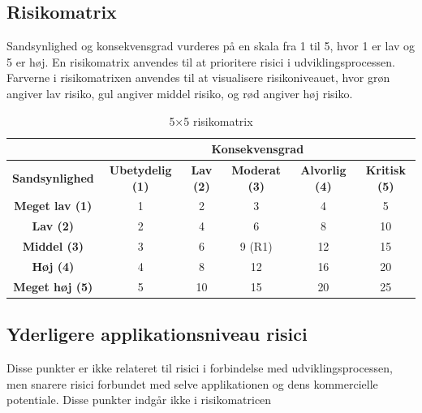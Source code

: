 \subsection{Risikomatrix}\label{subsec:risikomatrix}
Sandsynlighed og konsekvensgrad vurderes på en skala fra 1 til 5, hvor 1 er lav og 5 er høj.
En risikomatrix anvendes til at prioritere risici i udviklingsprocessen.
Farverne i risikomatrixen anvendes til at visualisere risikoniveauet, 
hvor grøn angiver lav risiko, gul angiver middel risiko, og rød angiver høj risiko.

\begin{table}[h]
    \centering
    \caption{5×5 risikomatrix}
    \label{tab:risikomatrix55}
    \begin{tabular}{|c|c|c|c|c|c|}
        \hline
         & \multicolumn{5}{|c|}{\textbf{Konsekvensgrad}} \\
        \hline
        \textbf{Sandsynlighed}
        & \textbf{Ubetydelig (1)}
        & \textbf{Lav (2)}
        & \textbf{Moderat (3)}
        & \textbf{Alvorlig (4)}
        & \textbf{Kritisk (5)} \\
        \hline
        \textbf{Meget lav (1)}
        & \cellcolor{green!40} 1
        & \cellcolor{green!40} 2
        & \cellcolor{green!40} 3
        & \cellcolor{yellow!40} 4
        & \cellcolor{yellow!40} 5 \\
        \hline
        \textbf{Lav (2)}
        & \cellcolor{green!40} 2
        & \cellcolor{green!40} 4
        & \cellcolor{yellow!40} 6
        & \cellcolor{yellow!40} 8
        & \cellcolor{red!40} 10 \\
        \hline
        \textbf{Middel (3)}
        & \cellcolor{green!40} 3
        & \cellcolor{yellow!40} 6
        & \cellcolor{yellow!40} 9 (R1)
        & \cellcolor{red!40} 12
        & \cellcolor{red!40} 15 \\
        \hline
        \textbf{Høj (4)}
        & \cellcolor{yellow!40} 4
        & \cellcolor{yellow!40} 8
        & \cellcolor{red!40} 12
        & \cellcolor{red!40} 16
        & \cellcolor{red!40} 20 \\
        \hline
        \textbf{Meget høj (5)}
        & \cellcolor{yellow!40} 5
        & \cellcolor{red!40} 10
        & \cellcolor{red!40} 15
        & \cellcolor{red!40} 20
        & \cellcolor{red!40} 25 \\
        \hline
    \end{tabular}
\end{table}


\subsection{Yderligere applikationsniveau risici}\label{sec:yderligere-risici}
Disse punkter er ikke relateret til risici i forbindelse med udviklingsprocessen, men snarere risici forbundet med selve applikationen og dens kommercielle potentiale.
Disse punkter indgår ikke i risikomatricen 

